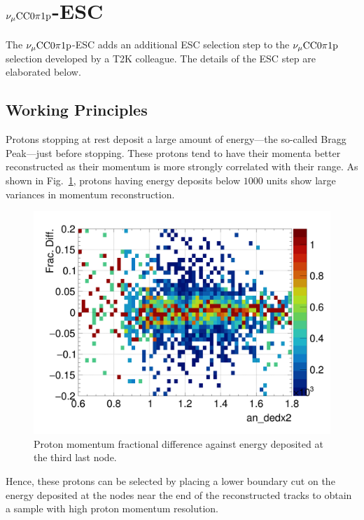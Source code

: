 \section{$\nu_{\mu}\textrm{CC}0\pi1\textrm{p}$-ESC}
\label{sec:sel-esc}
     The $\nu_{\mu}\textrm{CC}0\pi1\textrm{p}$-ESC adds an additional ESC selection step to the $\nu_{\mu}\textrm{CC}0\pi1\textrm{p}$ selection developed by a T2K colleague.
     The details of the ESC step are elaborated below.
    \subsection{Working Principles}
    \label{sec:sel-esc-wp}
     Protons stopping at rest deposit a large amount of energy—the so-called Bragg Peak—just before stopping.
     These protons tend to have their momenta better reconstructed as their momentum is more strongly correlated with their range. 
     As shown in Fig.~\ref{fig:dedx-pprres-eg}, protons having energy deposits below $1000$ units show large variances in momentum reconstruction. 

    \begin{figure}[h]
        \centering
        \includegraphics[width=\sgfidwid\linewidth]{figures/sel/an_dedx2_colnor_vs_p_pr_res_hist2d_al12_zoom.png}
        \caption{Proton momentum fractional difference against energy deposited at the third last node.}
        \label{fig:dedx-pprres-eg}
    \end{figure}
     Hence, these protons can be selected by placing a lower boundary cut on the energy deposited at the nodes near the end of the reconstructed tracks to obtain a sample with high proton momentum resolution.   
    
